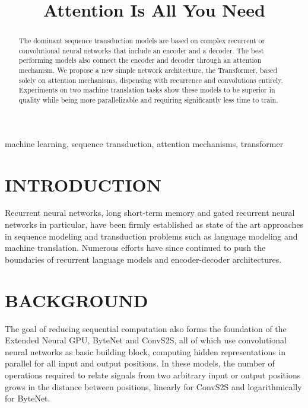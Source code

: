 \documentclass[conference]{IEEEtran}
\begin{document}
\title{Attention Is All You Need}

\author{
}

\maketitle

\begin{abstract}
The dominant sequence transduction models are based on complex recurrent or convolutional neural networks that include an encoder and a decoder. The best performing models also connect the encoder and decoder through an attention mechanism. We propose a new simple network architecture, the Transformer, based solely on attention mechanisms, dispensing with recurrence and convolutions entirely. Experiments on two machine translation tasks show these models to be superior in quality while being more parallelizable and requiring significantly less time to train.
\end{abstract}

\begin{IEEEkeywords}
machine learning, sequence transduction, attention mechanisms, transformer
\end{IEEEkeywords}

\section{INTRODUCTION}
Recurrent neural networks, long short-term memory and gated recurrent neural networks in particular, have been firmly established as state of the art approaches in sequence modeling and transduction problems such as language modeling and machine translation. Numerous efforts have since continued to push the boundaries of recurrent language models and encoder-decoder architectures.

\section{BACKGROUND}
The goal of reducing sequential computation also forms the foundation of the Extended Neural GPU, ByteNet and ConvS2S, all of which use convolutional neural networks as basic building block, computing hidden representations in parallel for all input and output positions. In these models, the number of operations required to relate signals from two arbitrary input or output positions grows in the distance between positions, linearly for ConvS2S and logarithmically for ByteNet.
\end{document}
